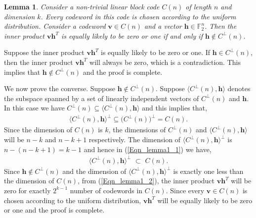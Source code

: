 \documentclass[10pt,journal]{IEEEtran}
\newtheorem{lemma}{Lemma}
\begin{document}
\begin{lemma}
% 
\label{Lemma_h_not_dual_equally}
%  
Consider a non-trivial linear block code $C(n)$ of length $n$ and dimension $k$.
Every codeword in this code is chosen according to the uniform distribution.
Consider a codeword $\mathbf{v} \in C(n)$ 
and a vector $\mathbf{h} \in \mathbb{F}_2^n$. 
Then the inner product $\mathbf{v} \mathbf{h}^{T}$
is equally likely to be zero or one if and only if $\mathbf{h} \notin C^{\perp}(n)$.
% 
\end{lemma}
% 
\begin{IEEEproof}
% 
Suppose the inner product $\mathbf{v} \mathbf{h}^{T}$ is equally likely
to be zero or one. If $\mathbf{h} \in C^{\perp}(n)$, then the inner product
$\mathbf{v} \mathbf{h}^{T}$ will always be zero, which is a contradiction.
This implies that $\mathbf{h} \notin C^{\perp}(n)$ and the proof is complete.

We now prove the converse. Suppose $\mathbf{h} \notin C^{\perp}(n)$.
Suppose $\langle C^{\perp}(n), \mathbf{h} \rangle$ denotes the subspace spanned by a set of linearly independent vectors of 
$C^{\perp}(n)$ and $\mathbf{h}$. 
% 
In this case we have $C^{\perp}(n) \subseteq \langle C^{\perp}(n), \mathbf{h} \rangle$ and this implies that,
% 
\begin{align}
% 
\Big\langle C^{\perp}(n), \mathbf{h} \Big \rangle^{\perp} \subseteq \Big(C^{\perp}(n)\Big)^{\perp} = C(n). 
\label{Eqn_lemma1_1}
% 
\end{align}
% 
Since the dimension of $C(n)$ is $k$,
the dimensions of $C^{\perp}(n)$ and $\langle C^{\perp}(n),\mathbf{h} \rangle$ will be $n-k$ and $n-k+1$
respectively. 
The dimension of $\langle C^{\perp}(n), \mathbf{h}\rangle^{\perp}$ is $n - (n-k+1)= k-1$ 
and hence in (\ref{Eqn_lemma1_1}) we have,
% 
\begin{align}
% 
\Big \langle C^{\perp}(n), \mathbf{h} \Big \rangle^{\perp} \mbox{~} \subset \mbox{~} C(n). 
\label{Eqn_lemma1_2}
% 
\end{align}
% 
Since $\mathbf{h} \notin C^{\perp}(n)$ and the dimension of $\langle C^{\perp}(n), \mathbf{h} \rangle^{\perp}$
is exactly one less than the dimension of $C(n)$, 
from (\ref{Eqn_lemma1_2}), the inner product $\mathbf{v} \mathbf{h}^{T}$ will be
zero for exactly $2^{k-1}$ number of codewords in $C(n)$.
Since every $\mathbf{v} \in C(n)$ is chosen according to the uniform distribution,
$\mathbf{v} \mathbf{h}^{T}$ will be equally likely to be zero or one and the proof is complete.
% 
\end{IEEEproof}
\end{document}
